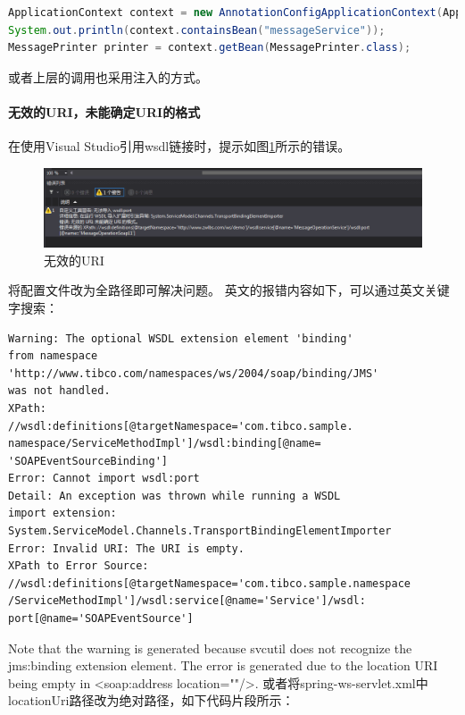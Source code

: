 \documentclass{book}
\begin{document}
\begin{lstlisting}[language=Java]
ApplicationContext context = new AnnotationConfigApplicationContext(Application.class);
System.out.println(context.containsBean("messageService"));
MessagePrinter printer = context.getBean(MessagePrinter.class);
\end{lstlisting}

或者上层的调用也采用注入的方式。

\paragraph{无效的URI，未能确定URI的格式}

在使用Visual Studio引用wsdl链接时，提示如图\ref{fig:WebRefrenceInvalidURI}所示的错误。

\begin{figure}[htbp]
	\centering
	\includegraphics[scale=0.5]{WebRefrenceInvalidURI.png}
	\caption{无效的URI}
	\label{fig:WebRefrenceInvalidURI}
\end{figure}


将配置文件改为全路径即可解决问题。
英文的报错内容如下，可以通过英文关键字搜索：

\begin{lstlisting}
Warning: The optional WSDL extension element 'binding'
from namespace
'http://www.tibco.com/namespaces/ws/2004/soap/binding/JMS'
was not handled.
XPath:
//wsdl:definitions[@targetNamespace='com.tibco.sample.
namespace/ServiceMethodImpl']/wsdl:binding[@name=
'SOAPEventSourceBinding']
Error: Cannot import wsdl:port
Detail: An exception was thrown while running a WSDL
import extension:
System.ServiceModel.Channels.TransportBindingElementImporter
Error: Invalid URI: The URI is empty.
XPath to Error Source:
//wsdl:definitions[@targetNamespace='com.tibco.sample.namespace
/ServiceMethodImpl']/wsdl:service[@name='Service']/wsdl:
port[@name='SOAPEventSource']
\end{lstlisting}

Note that the warning is generated because svcutil does not recognize the
jms:binding extension element.
The error is generated due to the location URI being empty in <soap:address
location=""/>.
或者将spring-ws-servlet.xml中locationUri路径改为绝对路径，如下代码片段所示：
\end{document}
